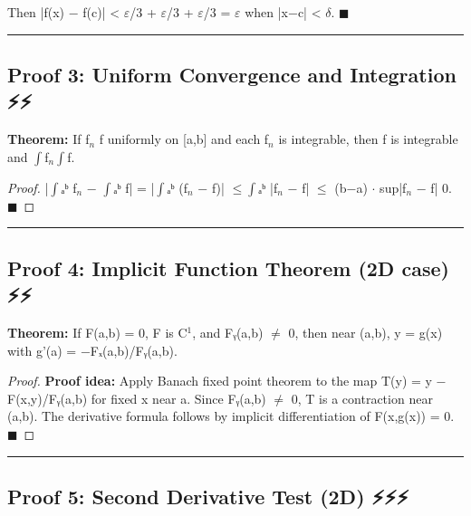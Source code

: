 \documentclass[12pt,a4paper,openany]{book}
\begin{document}
{{Then |f(x) − f(c)| < $\varepsilon$/3 + $\varepsilon$/3 + $\varepsilon$/3 = $\varepsilon$ when |x−c| < $\delta$. $\blacksquare$

\bigskip\noindent\rule{\textwidth}{0.4pt}\bigskip

\subsection{Proof 3: Uniform Convergence and Integration ⚡⚡}

\begin{tcolorbox}[colback=lightblue,colframe=thmblue,title=\textbf{Theorem},breakable,boxrule=1.5pt]
\textbf{Theorem:} If f$_n$  f uniformly on [a,b] and each f$_n$ is integrable, then f is integrable and $\int$f$_n\int$f.
\end{tcolorbox}

\begin{proof}

|$\int$ₐᵇ f$_n$ − $\int$ₐᵇ f| = |$\int$ₐᵇ (f$_n$ − f)| $\leq\int$ₐᵇ |f$_n$ − f| $\leq$ (b−a) $\cdot$ sup|f$_n$ − f|  0. $\blacksquare$
\end{proof}

\bigskip\noindent\rule{\textwidth}{0.4pt}\bigskip

\subsection{Proof 4: Implicit Function Theorem (2D case) ⚡⚡}

\begin{tcolorbox}[colback=lightblue,colframe=thmblue,title=\textbf{Theorem},breakable,boxrule=1.5pt]
\textbf{Theorem:} If F(a,b) = 0, F is C$^1$, and Fᵧ(a,b) $\neq$ 0, then near (a,b), y = g(x) with g'(a) = −Fₓ(a,b)/Fᵧ(a,b).
\end{tcolorbox}

\begin{proof}
\textbf{Proof idea:} Apply Banach fixed point theorem to the map T(y) = y − F(x,y)/Fᵧ(a,b) for fixed x near a. Since Fᵧ(a,b) $\neq$ 0, T is a contraction near (a,b). The derivative formula follows by implicit differentiation of F(x,g(x)) = 0. $\blacksquare$
\end{proof}

\bigskip\noindent\rule{\textwidth}{0.4pt}\bigskip

\subsection{Proof 5: Second Derivative Test (2D) ⚡⚡⚡}

}}
\end{document}
